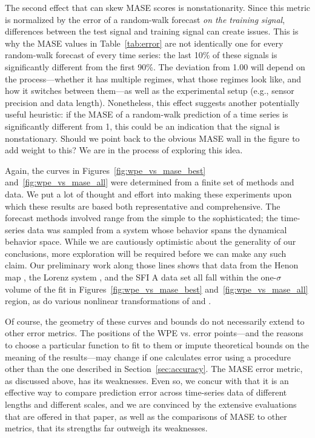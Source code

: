 
The second effect that can skew MASE scores is nonstationarity.  Since
this metric is normalized by the error of a random-walk forecast
\emph{on the training signal}, differences between the test signal and
training signal can create issues.  This is why the MASE values in
Table~\ref{tab:error} are not identically one for every random-walk
forecast of every time series: the last 10\% of these signals is
significantly different from the first 90\%.  The deviation from 1.00
will depend on the process---whether it has multiple regimes, what
those regimes look like, and how it switches between them---as well as
the experimental setup (e.g., sensor precision and data length).
Nonetheless, this effect suggests another potentially useful
heuristic: if the MASE of a random-walk prediction of a time series is
significantly different from 1, this could be an indication that the
signal is nonstationary.  \alert{Should we point back to the obvious
  MASE wall in the figure to add weight to this?}  We are in the
process of exploring this idea.

Again, the curves in Figures~\ref{fig:wpe_vs_mase_best}
and~\ref{fig:wpe_vs_mase_all} were determined from a finite set of
methods and data.  We put a lot of thought and effort into making
these experiments upon which these results are based both
representative and comprehensive.  The forecast methods involved range
from the simple to the sophisticated; the time-series data was sampled
from a system whose behavior spans the dynamical behavior space.
While we are cautiously optimistic about the generality of our
conclusions, more exploration will be required before we can make any
such claim.  Our preliminary work along those lines shows that data
from the Henon map \cite{henon}, the Lorenz system \cite{lorenz}, and
the SFI A data set \cite{sfi-data} all fall within the one-$\sigma$
volume of the fit in Figures~\ref{fig:wpe_vs_mase_best}
and~\ref{fig:wpe_vs_mase_all} region, as do various nonlinear
transformations of \svdtwo and \svdsix.

Of course, the geometry of these curves and bounds do not necessarily
extend to other error metrics.  The positions of the WPE vs. error
points---and the reasons to choose a particular function to fit to
them or impute theoretical bounds on the meaning of the results---may
change if one calculates error using a procedure other than the one
described in Section~\ref{sec:accuracy}.  The MASE error metric, as
discussed above, has its weaknesses.  Even so, we concur with
\cite{MASE} that it is an effective way to compare prediction error
across time-series data of different lengths and different scales, and
we are convinced by the extensive evaluations that are offered in that
paper, as well as the comparisons of MASE to other metrics, that its
strengths far outweigh its weaknesses.

